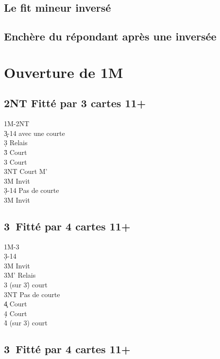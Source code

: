 \documentclass[a4paper]{article}
\begin{document}
\subsection{Le fit mineur inversé}

\subsection{Enchère du répondant après une inversée}

\section{Ouverture de 1M}

\subsection{2NT Fitté par 3 cartes 11+}

\begin{bidtable}
1M-2NT\\
3\c {}-14 avec une courte\+\\
3\d \> Relais\+\\
3\h \> Court \c \\
3\s \> Court \d \\
3NT \> Court M'\-\\
3M \> Invit\-\\
3\d {}-14 Pas de courte\+\\
3M \> Invit\-
\end{bidtable}

\subsection{3\pdfc\ Fitté par 4 cartes 11+}

\begin{bidtable}
1M-3\c\\
3\d {}-14\+\\
3M \> Invit\\
3M' \> Relais\+\\
3\s \> (sur 3\h ) court \h \\
3NT \> Pas de courte\\
4\c \> Court \c \\
4\d \> Court \d \\
4\h \> (sur 3\s ) court \s \-\-
\end{bidtable}

\subsection{3\pdfd\ Fitté par 4 cartes 11+}
\end{document}
